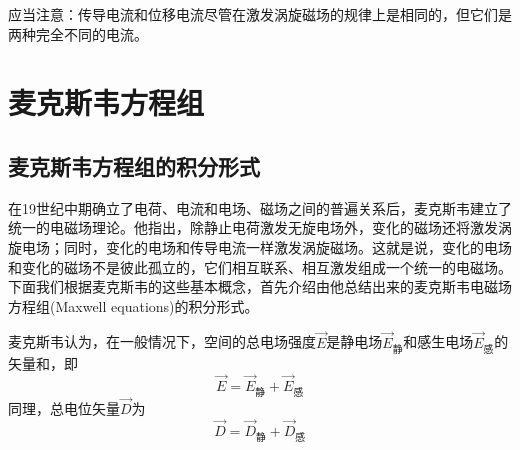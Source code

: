 \documentclass[12pt]{article}
\begin{document}
应当注意：传导电流和位移电流尽管在激发涡旋磁场的规律上是相同的，但它们是两种完全不同的电流。

\section{麦克斯韦方程组}

\subsection{麦克斯韦方程组的积分形式}

在19世纪中期确立了电荷、电流和电场、磁场之间的普遍关系后，麦克斯韦建立了统一的电磁场理论。他指出，除静止电荷激发无旋电场外，变化的磁场还将激发涡旋电场；同时，变化的电场和传导电流一样激发涡旋磁场。这就是说，变化的电场和变化的磁场不是彼此孤立的，它们相互联系、相互激发组成一个统一的电磁场。下面我们根据麦克斯韦的这些基本概念，首先介绍由他总结出来的麦克斯韦电磁场方程组(Maxwell equations)的积分形式。

麦克斯韦认为，在一般情况下，空间的总电场强度\(\overrightarrow{E}\)是静电场\(\overrightarrow{E}_{\text{静}}\)和感生电场\(\overrightarrow{E}_{\text{感}}\)的矢量和，即
\begin{equation}
    \overrightarrow{E} = \overrightarrow{E}_{\text{静}} + \overrightarrow{E}_{\text{感}}
\end{equation}
同理，总电位矢量\(\overrightarrow{D}\)为
\begin{equation}
    \overrightarrow{D} = \overrightarrow{D}_{\text{静}} + \overrightarrow{D}_{\text{感}}
\end{equation}
\end{document}
